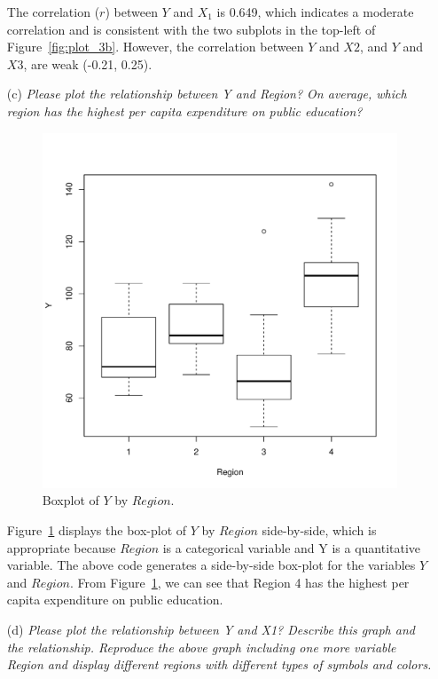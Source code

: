 \documentclass[12pt,letterpaper]{article}
\begin{document}
\begin{itemize}
The correlation ($r$) between $Y$ and $X_1$ is 0.649, which indicates a moderate correlation and is consistent with the two subplots in the top-left of Figure~\ref{fig:plot_3b}. However, the correlation between $Y$ and $X2$, and $Y$ and $X3$, are weak (-0.21, 0.25).

\newpage
\item [(c)]
\emph{Please plot the relationship between \emph{Y} and \emph{Region}? On average, which region has the highest per capita expenditure on public education?}

  

\begin{figure}[h!]\centering
	\caption{\footnotesize Boxplot of $Y$ by $Region$.}\vspace{-1cm}
	\label{fig:plot_3c}
	\includegraphics[width=.75\textwidth]{plot_3c.pdf}
\end{figure}

Figure~\ref{fig:plot_3c} displays the box-plot of $Y$ by $Region$ side-by-side, which is appropriate because $Region$ is a categorical variable and Y is a quantitative variable. The above code generates a side-by-side box-plot for the variables $Y$ and $Region$. From Figure~\ref{fig:plot_3c}, we can see that Region 4 has the highest per capita expenditure on public education.

\clearpage
\item [(d)] 
\emph{Please plot the relationship between \emph{Y} and \emph{X1}? Describe this graph and the relationship. Reproduce the above graph including one more variable \emph{Region} and display different regions with different types of symbols and colors.}
\end{itemize}
\end{document}
